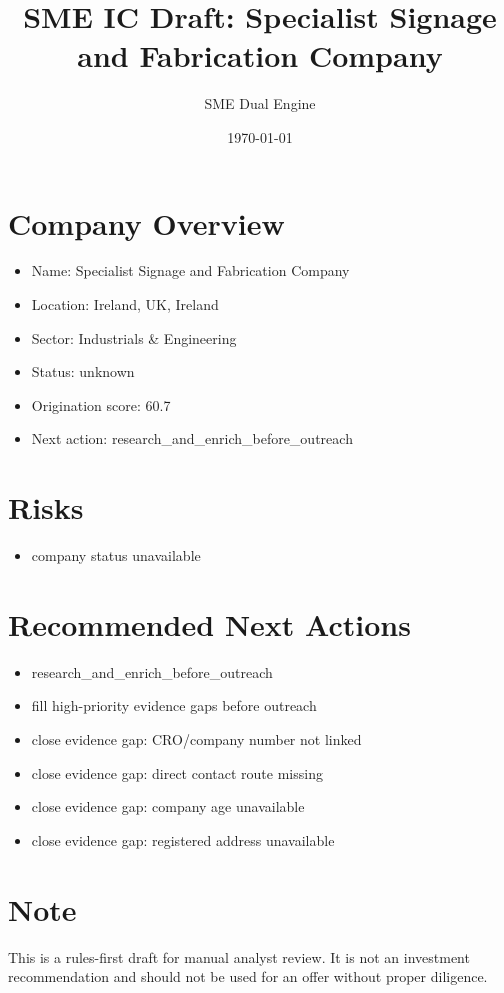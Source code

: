 \documentclass[11pt,a4paper]{article}
\title{SME IC Draft: Specialist Signage and Fabrication Company}
\author{SME Dual Engine}
\date{\today}
\begin{document}
\maketitle
\section*{Company Overview}
\begin{itemize}[leftmargin=1.4em]
\item Name: Specialist Signage and Fabrication Company
\item Location: Ireland, UK, Ireland
\item Sector: Industrials \& Engineering
\item Status: unknown
\item Origination score: 60.7
\item Next action: research\_and\_enrich\_before\_outreach
\end{itemize}
\section*{Risks}
\begin{itemize}[leftmargin=1.4em]
\item company status unavailable
\end{itemize}
\section*{Recommended Next Actions}
\begin{itemize}[leftmargin=1.4em]
\item research\_and\_enrich\_before\_outreach
\item fill high-priority evidence gaps before outreach
\item close evidence gap: CRO/company number not linked
\item close evidence gap: direct contact route missing
\item close evidence gap: company age unavailable
\item close evidence gap: registered address unavailable
\end{itemize}
\section*{Note}
This is a rules-first draft for manual analyst review. It is not an investment
recommendation and should not be used for an offer without proper diligence.
\end{document}
